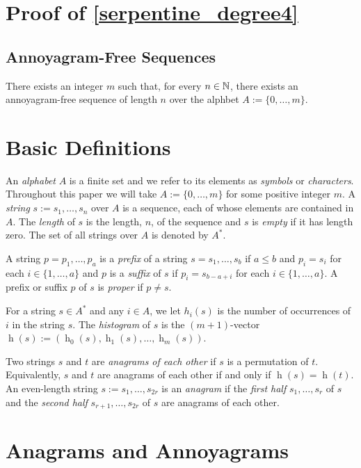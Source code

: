 \documentclass[kpfonts]{patmorin}
\DeclareMathOperator{\hist}{h}
\begin{document}
\section{Proof of \cref{serpentine_degree4}}

\subsection{Annoyagram-Free Sequences}

\begin{lem}
    There exists an integer $m$ such that, for every $n\in\mathbb{N}$, there exists an annoyagram-free sequence of length $n$ over the alphbet $A:=\{0,\ldots,m\}$.
\end{lem}


\section{Basic Definitions}

An \emph{alphabet} $A$ is a finite set and we refer to its elements as \emph{symbols} or \emph{characters}.  Throughout this paper we will take $A:=\{0,\ldots,m\}$ for some positive integer $m$.  A \emph{string} $s:=s_1,\ldots,s_n$ over $A$ is a sequence, each of whose elements are contained in $A$.  The \emph{length} of $s$ is the length, $n$, of the sequence and $s$ is \emph{empty} if it has length zero.  The set of all strings over $A$ is denoted by $A^*$.

A string $p=p_1,\ldots,p_a$ is a \emph{prefix} of a string $s=s_1,\ldots,s_b$ if $a\le b$ and $p_i=s_i$ for each $i\in\{1,\ldots,a\}$ and $p$ is a \emph{suffix} of $s$ if $p_i=s_{b-a+i}$ for each $i\in\{1,\ldots,a\}$. A  prefix or suffix $p$ of $s$ is \emph{proper} if $p\neq s$.

For a string $s\in A^*$ and any $i\in A$, we let $h_i(s)$ is the number of occurrences of $i$ in the string $s$.  The \emph{histogram} of $s$ is the $(m+1)$-vector $\hist(s):=(\hist_0(s),\hist_1(s),\ldots,\hist_m(s))$.

Two strings $s$ and $t$ are \emph{anagrams of each other} if $s$ is a permutation of $t$.  Equivalently, $s$ and $t$ are anagrams of each other if and only if $\hist(s)=\hist(t)$.  An even-length string $s:=s_1,\ldots,s_{2r}$ is an \emph{anagram} if the \emph{first half} $s_1,\ldots,s_r$ of $s$ and the \emph{second half} $s_{r+1},\ldots,s_{2r}$ of $s$ are anagrams of each other.

\section{Anagrams and Annoyagrams}
\end{document}
